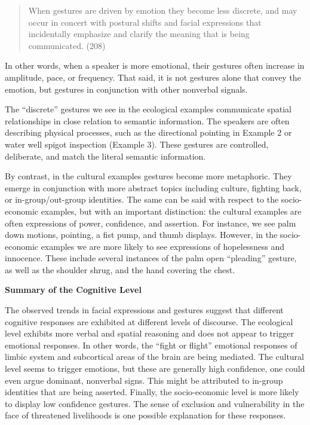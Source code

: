 \begin{quote}
When gestures are driven by emotion they become less discrete, and may
occur in concert with postural shifts and facial expressions that incidentally emphasize and clarify the meaning that is being communicated. (208)
\end{quote}

In other words, when a speaker is more emotional, their gestures often increase in amplitude, pace, or frequency. That said, it is not gestures alone that convey the emotion, but gestures in conjunction with other nonverbal signals. 

The ``discrete'' gestures we see in the ecological examples communicate spatial relationships in close relation to semantic information. The speakers are often describing physical processes, such as the directional pointing in Example 2 or water well spigot inspection (Example 3). These gestures are controlled, deliberate, and match the literal semantic information. 

By contrast, in the cultural examples gestures become more metaphoric. They emerge in conjunction with more abstract topics including culture, fighting back, or in-group/out-group identities. The same can be said with respect to the socio-economic examples, but with an important distinction: the cultural examples are often expressions of power, confidence, and assertion. For instance, we see palm down motions, pointing, a fist pump, and thumb displays. However, in the socio-economic examples we are more likely to see expressions of hopelessness and innocence. These include several instances of the palm open ``pleading'' gesture, as well as the shoulder shrug, and the hand covering the chest.      

\textbf{Summary of the Cognitive Level}

The observed trends in facial expressions and gestures suggest that different cognitive responses are exhibited at different levels of discourse. The ecological level exhibits more verbal and spatial reasoning and does not appear to trigger emotional responses. In other words, the ``fight or flight'' emotional responses of limbic system and subcortical areas of the brain are being mediated. The cultural level seems to trigger emotions, but these are generally high confidence, one could even argue dominant, nonverbal signs. This might be attributed to in-group identities that are being asserted. Finally, the socio-economic level is more likely to display low confidence gestures. The sense of exclusion and vulnerability in the face of threatened livelihoods is one possible explanation for these responses.

